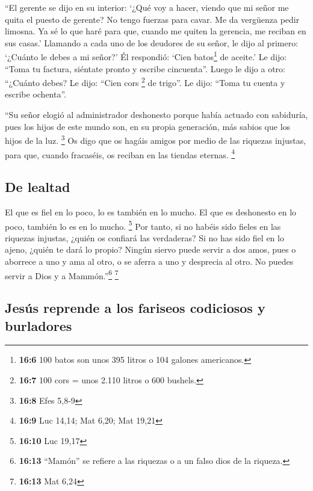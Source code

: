  ``El gerente se dijo en su interior: `¿Qué voy a hacer,
viendo que mi señor me quita el puesto de gerente? No tengo fuerzas para
cavar. Me da vergüenza pedir limosna.  Ya sé lo que haré
para que, cuando me quiten la gerencia, me reciban en sus casas.'
 Llamando a cada uno de los deudores de su señor, le dijo
al primero: `¿Cuánto le debes a mi señor?'  Él respondió:
`Cien batos\footnote{\textbf{16:6} 100 batos son unos 395 litros o 104
  galones americanos.} de aceite.' Le dijo: ``Toma tu factura, siéntate
pronto y escribe cincuenta''.  Luego le dijo a otro:
``¿Cuánto debes? Le dijo: ``Cien cors \footnote{\textbf{16:7} 100 cors =
  unos 2.110 litros o 600 bushels.} de trigo''. Le dijo: ``Toma tu
cuenta y escribe ochenta''.

 ``Su señor elogió al administrador deshonesto porque
había actuado con sabiduría, pues los hijos de este mundo son, en su
propia generación, más sabios que los hijos de la luz. \footnote{\textbf{16:8}
  Efes 5,8-9}  Os digo que os hagáis amigos por medio de
las riquezas injustas, para que, cuando fracaséis, os reciban en las
tiendas eternas. \footnote{\textbf{16:9} Luc 14,14; Mat 6,20; Mat 19,21}

\hypertarget{de-lealtad}{%
\subsection{De lealtad}\label{de-lealtad}}

 El que es fiel en lo poco, lo es también en lo mucho. El
que es deshonesto en lo poco, también lo es en lo mucho. \footnote{\textbf{16:10}
  Luc 19,17}  Por tanto, si no habéis sido fieles en las
riquezas injustas, ¿quién os confiará las verdaderas?  Si
no has sido fiel en lo ajeno, ¿quién te dará lo propio? 
Ningún siervo puede servir a dos amos, pues o aborrece a uno y ama al
otro, o se aferra a uno y desprecia al otro. No puedes servir a Dios y a
Mammón.''\footnote{\textbf{16:13} ``Mamón'' se refiere a las riquezas o
  a un falso dios de la riqueza.} \footnote{\textbf{16:13} Mat 6,24}

\hypertarget{jesuxfas-reprende-a-los-fariseos-codiciosos-y-burladores}{%
\subsection{Jesús reprende a los fariseos codiciosos y
burladores}\label{jesuxfas-reprende-a-los-fariseos-codiciosos-y-burladores}}

